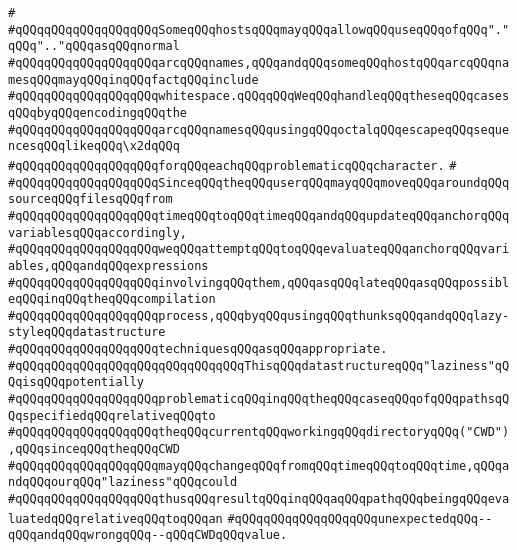 \verb|#|\newline
\verb|#qQQqqQQqqQQqqQQqqQQqSomeqQQqhostsqQQqmayqQQqallowqQQquseqQQqofqQQq"."qQQq".."qQQqasqQQqnormal|\newline
\verb|#qQQqqQQqqQQqqQQqqQQqarcqQQqnames,qQQqandqQQqsomeqQQqhostqQQqarcqQQqnamesqQQqmayqQQqinqQQqfactqQQqinclude|\newline
\verb|#qQQqqQQqqQQqqQQqqQQqwhitespace.qQQqqQQqWeqQQqhandleqQQqtheseqQQqcasesqQQqbyqQQqencodingqQQqthe|\newline
\verb|#qQQqqQQqqQQqqQQqqQQqarcqQQqnamesqQQqusingqQQqoctalqQQqescapeqQQqsequencesqQQqlikeqQQq\x2dqQQq|\newline
\verb|#qQQqqQQqqQQqqQQqqQQqforqQQqeachqQQqproblematicqQQqcharacter.|\newline
\verb|#|\newline
\verb|#qQQqqQQqqQQqqQQqqQQqSinceqQQqtheqQQquserqQQqmayqQQqmoveqQQqaroundqQQqsourceqQQqfilesqQQqfrom|\newline
\verb|#qQQqqQQqqQQqqQQqqQQqtimeqQQqtoqQQqtimeqQQqandqQQqupdateqQQqanchorqQQqvariablesqQQqaccordingly,|\newline
\verb|#qQQqqQQqqQQqqQQqqQQqweqQQqattemptqQQqtoqQQqevaluateqQQqanchorqQQqvariables,qQQqandqQQqexpressions|\newline
\verb|#qQQqqQQqqQQqqQQqqQQqinvolvingqQQqthem,qQQqasqQQqlateqQQqasqQQqpossibleqQQqinqQQqtheqQQqcompilation|\newline
\verb|#qQQqqQQqqQQqqQQqqQQqprocess,qQQqbyqQQqusingqQQqthunksqQQqandqQQqlazy-styleqQQqdatastructure|\newline
\verb|#qQQqqQQqqQQqqQQqqQQqtechniquesqQQqasqQQqappropriate.|\newline
\verb|#qQQqqQQqqQQqqQQqqQQqqQQqqQQqqQQqThisqQQqdatastructureqQQq"laziness"qQQqisqQQqpotentially|\newline
\verb|#qQQqqQQqqQQqqQQqqQQqproblematicqQQqinqQQqtheqQQqcaseqQQqofqQQqpathsqQQqspecifiedqQQqrelativeqQQqto|\newline
\verb|#qQQqqQQqqQQqqQQqqQQqtheqQQqcurrentqQQqworkingqQQqdirectoryqQQq("CWD"),qQQqsinceqQQqtheqQQqCWD|\newline
\verb|#qQQqqQQqqQQqqQQqqQQqmayqQQqchangeqQQqfromqQQqtimeqQQqtoqQQqtime,qQQqandqQQqourqQQq"laziness"qQQqcould|\newline
\verb|#qQQqqQQqqQQqqQQqqQQqthusqQQqresultqQQqinqQQqaqQQqpathqQQqbeingqQQqevaluatedqQQqrelativeqQQqtoqQQqan|\newline
\verb|#qQQqqQQqqQQqqQQqqQQqunexpectedqQQq--qQQqandqQQqwrongqQQq--qQQqCWDqQQqvalue.|\newline
